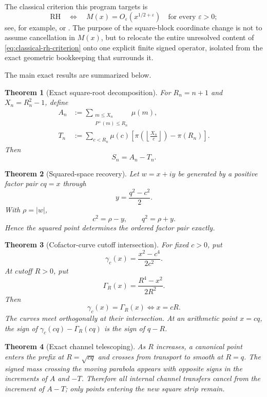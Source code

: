\documentclass[11pt]{article}
\newtheorem{theorem}{Theorem}[section]
\theoremstyle{definition}
\newcommand{\eps}{\varepsilon}
\newcommand{\Pplus}{P^{+}}
\newcommand{\1}{\mathbf{1}}
\begin{document}
The classical criterion this program targets is
\begin{equation}\label{eq:classical-rh-criterion}
 \mathrm{RH}
 \quad\Longleftrightarrow\quad
 M(x)=O_{\eps}\!\left(x^{1/2+\eps}\right)
 \quad\text{for every }\eps>0;
\end{equation}
see, for example, \cite[Ch.~14]{titchmarsh} or \cite{montgomery-vaughan}.  The purpose of the square-block coordinate change is not to assume cancellation in $M(x)$, but to relocate the entire unresolved content of \cref{eq:classical-rh-criterion} onto one explicit finite signed operator, isolated from the exact geometric bookkeeping that surrounds it.

The main exact results are summarized below.

\begin{theorem}[Exact square-root decomposition]
\label{thm:intro-decomposition}
For $R_n=n+1$ and $X_n=R_n^2-1$, define
\begin{align*}
 A_n&:=\sum_{\substack{m\le X_n\\\Pplus(m)\le R_n}}\mu(m),\\
 T_n&:=\sum_{c<R_n}\mu(c)
 \left[
 \pi\!\left(\left\lfloor\frac{X_n}{c}\right\rfloor\right)-\pi(R_n)
 \right].
\end{align*}
Then
\[
 \boxed{S_n=A_n-T_n.}
\]
\end{theorem}

\begin{theorem}[Squared-space recovery]
\label{thm:intro-recovery}
Let $w=x+iy$ be generated by a positive factor pair $cq=x$ through
\[
 y=\frac{q^2-c^2}{2}.
\]
With $\rho=|w|$,
\[
 \boxed{c^2=\rho-y,\qquad q^2=\rho+y.}
\]
Hence the squared point determines the ordered factor pair exactly.
\end{theorem}

\begin{theorem}[Cofactor-curve cutoff intersection]
\label{thm:intro-intersection}
For fixed $c>0$, put
\[
 \gamma_c(x)=\frac{x^2-c^4}{2c^2}.
\]
At cutoff $R>0$, put
\[
 \Gamma_R(x)=\frac{R^4-x^2}{2R^2}.
\]
Then
\[
 \boxed{\gamma_c(x)=\Gamma_R(x)\iff x=cR.}
\]
The curves meet orthogonally at their intersection.  At an arithmetic point $x=cq$, the sign of $\gamma_c(cq)-\Gamma_R(cq)$ is the sign of $q-R$.
\end{theorem}

\begin{theorem}[Exact channel telescoping]
\label{thm:intro-telescoping}
As $R$ increases, a canonical point enters the prefix at $R=\sqrt{cq}$ and crosses from transport to smooth at $R=q$.  The signed mass crossing the moving parabola appears with opposite signs in the increments of $A$ and $-T$.  Therefore all internal channel transfers cancel from the increment of $A-T$; only points entering the new square strip remain.
\end{theorem}
\end{document}
